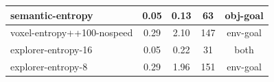 \begin{longtable}{|l|c|c|c|c|}
{\cellcolor[HTML]{C4D7B8}} \color[HTML]{000000}         semantic-entropy         &      0.05      &       0.13   &   63 &                    {\cellcolor[HTML]{C4D7B8}} \color[HTML]{000000} obj-goal \\ \hline
{\cellcolor[HTML]{D7C5AF}} \color[HTML]{000000}         voxel-entropy++100-nospeed       &        0.29        &         2.10     &   147 &         {\cellcolor[HTML]{D7C5AF}} \color[HTML]{000000}     env-goal \\ \hline
{\cellcolor[HTML]{B5C3D7}} \color[HTML]{000000}         explorer-entropy-16      &       0.05       &        0.22    &   31 &                 {\cellcolor[HTML]{B5C3D7}} \color[HTML]{000000} both \\ \hline
{\cellcolor[HTML]{D7C5AF}} \color[HTML]{000000}         explorer-entropy-8       &        0.29        &         1.96     &   151 &                 {\cellcolor[HTML]{D7C5AF}} \color[HTML]{000000}   env-goal \\ \hline

   
    
    
    

\end{longtable}
